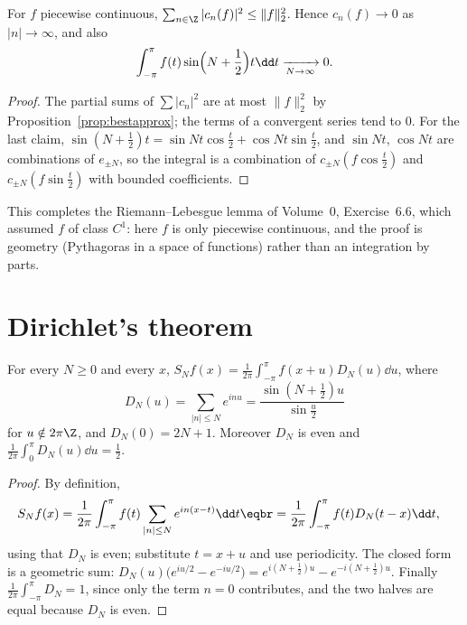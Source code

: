 \begin{corollary}\label{cor:bessel}
For $f$ piecewise continuous, $\sum_{n\in\Z}|c_n(f)|^2\le\|f\|_2^2$. Hence $c_n(f)\to0$ as $|n|\to\infty$, and also
\[
\int_{-\pi}^\pi f(t)\sin\Bigl(N+\frac12\Bigr)t\dd t\xrightarrow[N\to\infty]{}0.
\]
\end{corollary}
\begin{proof}
The partial sums of $\sum|c_n|^2$ are at most $\|f\|_2^2$ by Proposition~\ref{prop:bestapprox}; the terms of a convergent series tend
to $0$. For the last claim, $\sin(N+\frac12)t=\sin Nt\cos\frac t2+\cos Nt\sin\frac t2$, and $\sin Nt$, $\cos Nt$ are combinations of $e_{\pm N}$,
so the integral is a combination of $c_{\pm N}(f\cos\frac t2)$ and $c_{\pm N}(f\sin\frac t2)$ with bounded coefficients.
\end{proof}

This completes the Riemann--Lebesgue lemma of Volume~0, Exercise~6.6, which assumed $f$ of class $C^1$: here $f$ is only
piecewise continuous, and the proof is geometry (Pythagoras in a space of functions) rather than an integration by parts.

\section{Dirichlet's theorem}

\begin{lemma}\label{lem:dirichletkernel}
For every $N\ge0$ and every $x$, $S_Nf(x)=\frac1{2\pi}\int_{-\pi}^\pi f(x+u)D_N(u)\dd u$, where
\[
D_N(u)=\sum_{|n|\le N}e^{inu}=\frac{\sin(N+\frac12)u}{\sin\frac u2}
\]
for $u\notin2\pi\Z$, and $D_N(0)=2N+1$. Moreover $D_N$ is even and $\frac1{2\pi}\int_0^\pi D_N(u)\dd u=\frac12$.
\end{lemma}
\begin{proof}
By definition,
\[
\begin{aligned}S_Nf(x)&=\frac1{2\pi}\int_{-\pi}^\pi f(t)\sum_{|n|\le N}e^{in(x-t)}\dd t\eqbr=\frac1{2\pi}\int_{-\pi}^\pi f(t)D_N(t-x)\dd t,\end{aligned}
\]
using that $D_N$ is even; substitute $t=x+u$ and use periodicity. The closed form is a geometric sum:
$D_N(u)\bigl(e^{iu/2}-e^{-iu/2}\bigr)=e^{i(N+\frac12)u}-e^{-i(N+\frac12)u}$. Finally $\frac1{2\pi}\int_{-\pi}^\pi D_N=1$, since only the term $n=0$
contributes, and the two halves are equal because $D_N$ is even.
\end{proof}

